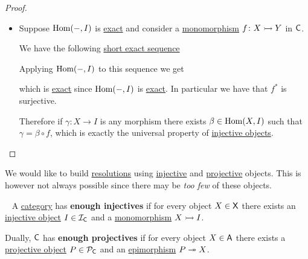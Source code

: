 \documentclass[../../main]{subfiles}
\begin{document}
\begin{proof}
\begin{itemize}
          Consider a morphism \(\alpha\colon X \to I\).
          Since \(f\) is a \hyperref[def:mono-epi-morphism]{monomorphism} and \(I\) is \hyperref[def:injective-projective-object]{injective} there exists a morphism \(\beta\colon Y \to I\) such that \(\beta \circ f = f^{\ast}(\beta) = \alpha\), making \(f^{\ast}\) surjective as wanted.

    \item[\(\impliedby\)] Suppose \(\operatorname{Hom}(-, I)\) is \hyperref[def:exact-functor]{exact} and consider a \hyperref[def:mono-epi-morphism]{monomorphism} \(f\colon X \rightarrowtail Y\) in \(\mathsf{C}\).

          We have the following \hyperref[def:exact-sequence]{short exact sequence}
          \begin{center}
          \end{center}
          Applying \(\operatorname{Hom}(-, I)\) to this sequence we get
           \begin{center}
          \end{center}
          which is \hyperref[def:exact-sequence]{exact} since \(\operatorname{Hom}(-, I)\) is \hyperref[def:exact-functor]{exact}.
          In particular we have that \(f^{\ast}\) is surjective.

          Therefore if \(\gamma\colon X \to I\) is any morphism there exists \(\beta \in \operatorname{Hom}(X, I)\) such that \(\gamma = \beta \circ f\), which is exactly the universal property of \hyperref[def:injective-projective-object]{injective objects}. \qedhere
  \end{itemize}
\end{proof}

We would like to build \hyperref[def:resolution]{resolutions} using \hyperref[def:injective-projective-object]{injective} and \hyperref[def:injective-projective-object]{projective} objects.
This is however not always possible since there may be \textit{too few} of these objects.
\begin{definition}\label{def:enough-injectives-projectives}~
  A \hyperref[def:category]{category} has \textbf{enough injectives} if for every object \(X \in \mathsf{X}\) there exists an \hyperref[def:injective-projective-object]{injective object} \(I \in \mathcal{I}_{\mathsf{C}}\) and a \hyperref[def:mono-epi-morphism]{monomorphism} \(X \rightarrowtail I\).

  Dually, \(\mathsf{C}\) has \textbf{enough projectives} if for every object \(X \in \mathsf{A}\) there exists a \hyperref[def:injective-projective-object]{projective object} \(P \in \mathcal{P}_{\mathsf{C}}\) and an \hyperref[def:mono-epi-morphism]{epimorphism} \(P \twoheadrightarrow X\).
\end{definition}
\end{document}
